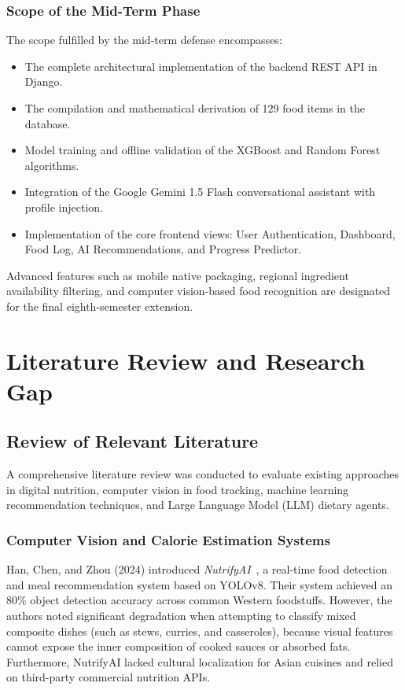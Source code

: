 \documentclass[12pt,a4paper]{report}
\begin{document}
\subsection{Scope of the Mid-Term Phase}
The scope fulfilled by the mid-term defense encompasses:
\begin{itemize}
  \item The complete architectural implementation of the backend REST API in Django.
  \item The compilation and mathematical derivation of 129 food items in the database.
  \item Model training and offline validation of the XGBoost and Random Forest algorithms.
  \item Integration of the Google Gemini 1.5 Flash conversational assistant with profile injection.
  \item Implementation of the core frontend views: User Authentication, Dashboard, Food Log, AI Recommendations, and Progress Predictor.
\end{itemize}
Advanced features such as mobile native packaging, regional ingredient availability filtering, and computer vision-based food recognition are designated for the final eighth-semester extension.

\chapter{Literature Review and Research Gap}

\section{Review of Relevant Literature}

A comprehensive literature review was conducted to evaluate existing approaches in digital nutrition, computer vision in food tracking, machine learning recommendation techniques, and Large Language Model (LLM) dietary agents.

\subsection{Computer Vision and Calorie Estimation Systems}
Han, Chen, and Zhou (2024) introduced \textit{NutrifyAI}~\cite{han2024}, a real-time food detection and meal recommendation system based on YOLOv8. Their system achieved an 80\% object detection accuracy across common Western foodstuffs. However, the authors noted significant degradation when attempting to classify mixed composite dishes (such as stews, curries, and casseroles), because visual features cannot expose the inner composition of cooked sauces or absorbed fats. Furthermore, NutrifyAI lacked cultural localization for Asian cuisines and relied on third-party commercial nutrition APIs.
\end{document}
